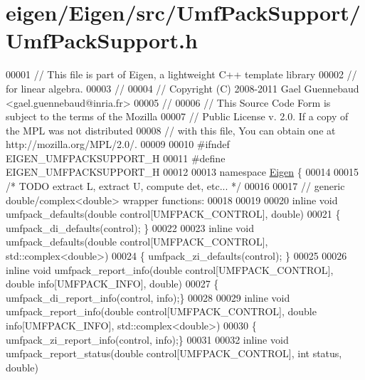\hypertarget{eigen_2_eigen_2src_2_umf_pack_support_2_umf_pack_support_8h_source}{}\section{eigen/\+Eigen/src/\+Umf\+Pack\+Support/\+Umf\+Pack\+Support.h}
\label{eigen_2_eigen_2src_2_umf_pack_support_2_umf_pack_support_8h_source}

\begin{DoxyCode}
00001 \textcolor{comment}{// This file is part of Eigen, a lightweight C++ template library}
00002 \textcolor{comment}{// for linear algebra.}
00003 \textcolor{comment}{//}
00004 \textcolor{comment}{// Copyright (C) 2008-2011 Gael Guennebaud <gael.guennebaud@inria.fr>}
00005 \textcolor{comment}{//}
00006 \textcolor{comment}{// This Source Code Form is subject to the terms of the Mozilla}
00007 \textcolor{comment}{// Public License v. 2.0. If a copy of the MPL was not distributed}
00008 \textcolor{comment}{// with this file, You can obtain one at http://mozilla.org/MPL/2.0/.}
00009 
00010 \textcolor{preprocessor}{#ifndef EIGEN\_UMFPACKSUPPORT\_H}
00011 \textcolor{preprocessor}{#define EIGEN\_UMFPACKSUPPORT\_H}
00012 
00013 \textcolor{keyword}{namespace }\hyperlink{namespace_eigen}{Eigen} \{
00014 
00015 \textcolor{comment}{/* TODO extract L, extract U, compute det, etc... */}
00016 
00017 \textcolor{comment}{// generic double/complex<double> wrapper functions:}
00018 
00019 
00020 \textcolor{keyword}{inline} \textcolor{keywordtype}{void} umfpack\_defaults(\textcolor{keywordtype}{double} control[UMFPACK\_CONTROL], \textcolor{keywordtype}{double})
00021 \{ umfpack\_di\_defaults(control); \}
00022 
00023 \textcolor{keyword}{inline} \textcolor{keywordtype}{void} umfpack\_defaults(\textcolor{keywordtype}{double} control[UMFPACK\_CONTROL], std::complex<double>)
00024 \{ umfpack\_zi\_defaults(control); \}
00025 
00026 \textcolor{keyword}{inline} \textcolor{keywordtype}{void} umfpack\_report\_info(\textcolor{keywordtype}{double} control[UMFPACK\_CONTROL], \textcolor{keywordtype}{double} info[UMFPACK\_INFO], \textcolor{keywordtype}{double})
00027 \{ umfpack\_di\_report\_info(control, info);\}
00028 
00029 \textcolor{keyword}{inline} \textcolor{keywordtype}{void} umfpack\_report\_info(\textcolor{keywordtype}{double} control[UMFPACK\_CONTROL], \textcolor{keywordtype}{double} info[UMFPACK\_INFO], 
      std::complex<double>)
00030 \{ umfpack\_zi\_report\_info(control, info);\}
00031 
00032 \textcolor{keyword}{inline} \textcolor{keywordtype}{void} umfpack\_report\_status(\textcolor{keywordtype}{double} control[UMFPACK\_CONTROL], \textcolor{keywordtype}{int} status, \textcolor{keywordtype}{double})

\end{DoxyCode}
